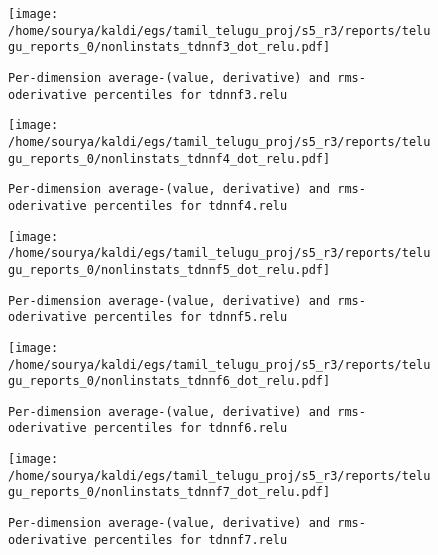 \documentclass[prl,10pt,twocolumn]{revtex4}
\begin{document}
\newpage
\begin{figure}[h]
  \begin{center}
    \caption{\texttt{Per-dimension average-(value, derivative) and rms-oderivative percentiles for tdnnf3.relu}}
    \texttt{[image: /home/sourya/kaldi/egs/tamil\_telugu\_proj/s5\_r3/reports/telugu\_reports\_0/nonlinstats\_tdnnf3\_dot\_relu.pdf]}
  \end{center}
\end{figure}
\clearpage


\newpage
\begin{figure}[h]
  \begin{center}
    \caption{\texttt{Per-dimension average-(value, derivative) and rms-oderivative percentiles for tdnnf4.relu}}
    \texttt{[image: /home/sourya/kaldi/egs/tamil\_telugu\_proj/s5\_r3/reports/telugu\_reports\_0/nonlinstats\_tdnnf4\_dot\_relu.pdf]}
  \end{center}
\end{figure}
\clearpage


\newpage
\begin{figure}[h]
  \begin{center}
    \caption{\texttt{Per-dimension average-(value, derivative) and rms-oderivative percentiles for tdnnf5.relu}}
    \texttt{[image: /home/sourya/kaldi/egs/tamil\_telugu\_proj/s5\_r3/reports/telugu\_reports\_0/nonlinstats\_tdnnf5\_dot\_relu.pdf]}
  \end{center}
\end{figure}
\clearpage


\newpage
\begin{figure}[h]
  \begin{center}
    \caption{\texttt{Per-dimension average-(value, derivative) and rms-oderivative percentiles for tdnnf6.relu}}
    \texttt{[image: /home/sourya/kaldi/egs/tamil\_telugu\_proj/s5\_r3/reports/telugu\_reports\_0/nonlinstats\_tdnnf6\_dot\_relu.pdf]}
  \end{center}
\end{figure}
\clearpage


\newpage
\begin{figure}[h]
  \begin{center}
    \caption{\texttt{Per-dimension average-(value, derivative) and rms-oderivative percentiles for tdnnf7.relu}}
    \texttt{[image: /home/sourya/kaldi/egs/tamil\_telugu\_proj/s5\_r3/reports/telugu\_reports\_0/nonlinstats\_tdnnf7\_dot\_relu.pdf]}
  \end{center}
\end{figure}
\clearpage
\end{document}
